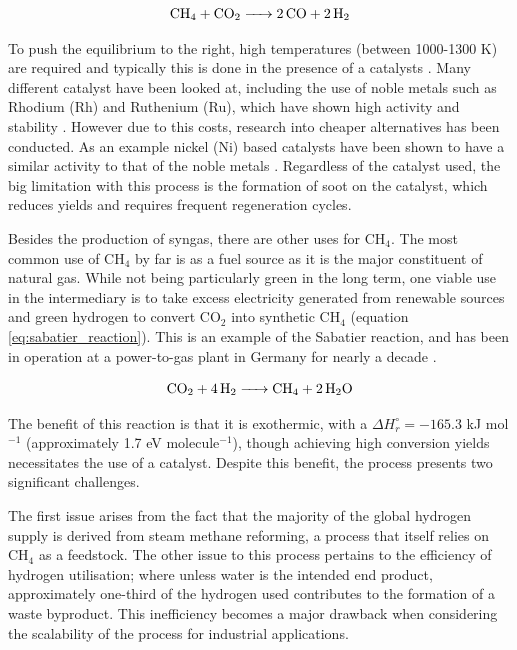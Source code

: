 \begin{equation}
    \ce{CH_4 + CO_2 -> 2CO + 2H_2}
    \label{eq:drm}
\end{equation}

To push the equilibrium to the right, high temperatures (between 1000-1300 K) are required and typically this is done in the presence of a catalysts \cite{pakhare_spivey_2014}. Many different catalyst have been looked at, including the use of noble metals such as Rhodium (Rh) and Ruthenium (Ru), which have shown high activity and stability \cite{Rezaei2006, Rostrup-Nielsen1993}. However due to this costs, research into cheaper alternatives has been conducted. As an example  nickel (Ni) based catalysts have been shown to have a similar activity to that of the noble metals \cite{Ma2009}. Regardless of the catalyst used, the big limitation with this process is the formation of soot on the catalyst, which reduces yields and requires frequent regeneration cycles.

Besides the production of syngas, there are other uses for CH$_4$. The most common use of CH$_4$ by far is as a fuel source as it is the major constituent of natural gas. While not being particularly green in the long term, one viable use in the intermediary is to take excess electricity generated from renewable sources and green hydrogen to convert CO$_2$ into synthetic CH$_4$ (equation \ref{eq:sabatier_reaction}). This is an example of the Sabatier reaction, and has been in operation at a power-to-gas plant in Germany for nearly a decade \cite{etogas}.

\begin{equation}
    \ce{CO_2 + 4H_2 -> CH_4 + 2H_2O}
    \label{eq:sabatier_reaction}
\end{equation}

The benefit of this reaction is that it is exothermic, with a $\Delta H^\circ_r = -165.3$ kJ mol$^{-1}$ (approximately 1.7 eV molecule$^{-1}$), though achieving high conversion yields necessitates the use of a catalyst. Despite this benefit, the process presents two significant challenges.

The first issue arises from the fact that the majority of the global hydrogen supply is derived from steam methane reforming, a process that itself relies on CH$_4$ as a feedstock. The other issue to this process pertains to the efficiency of hydrogen utilisation; where unless water is the intended end product, approximately one-third of the hydrogen used contributes to the formation of a waste byproduct. This inefficiency becomes a major drawback when considering the scalability of the process for industrial applications.

